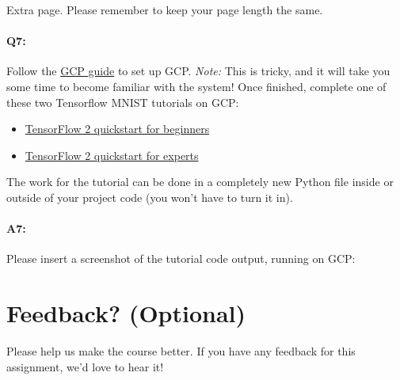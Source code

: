 
\pagebreak
Extra page. Please remember to keep your page length the same.


\pagebreak
\paragraph{Q7:} Follow the \href{https://cs.brown.edu/courses/csci1430/proj4/gcp-guide/}{GCP guide} to set up GCP. \emph{Note:} This is tricky, and it will take you some time to become familiar with the system! Once finished, complete one of these two Tensorflow MNIST tutorials on GCP:
\begin{itemize}
	\item \href{https://www.tensorflow.org/tutorials/quickstart/beginner}{TensorFlow 2 quickstart for beginners}
	\item \href{https://www.tensorflow.org/tutorials/quickstart/advanced}{TensorFlow 2 quickstart for experts}
\end{itemize}

The work for the tutorial can be done in a completely new Python file inside or outside of your project code (you won't have to turn it in).


\paragraph{A7:} Please insert a screenshot of the tutorial code output, running on GCP:





\pagebreak
\section*{Feedback? (Optional)}
Please help us make the course better. If you have any feedback for this assignment, we'd love to hear it!





